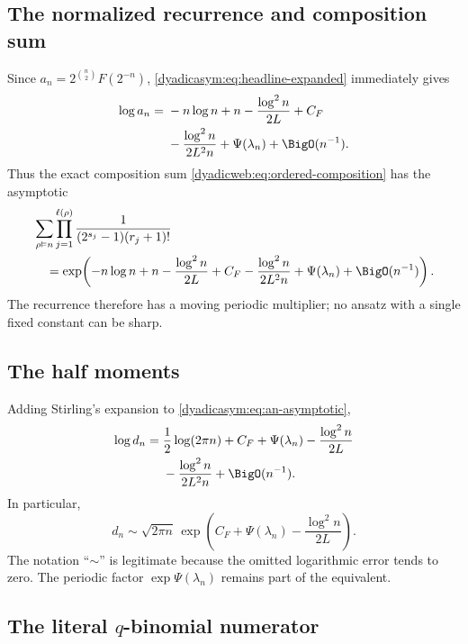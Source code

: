\documentclass[11pt,oneside]{article}
\theoremstyle{definition}
\theoremstyle{remark}
\begin{document}
\subsection{The normalized recurrence and composition sum}

Since $a_n=2^{\binom n2}F(2^{-n})$, \eqref{dyadicasym:eq:headline-expanded} immediately gives
\begin{align}
 \log a_n={}&-n\log n+n-\frac{\log^2n}{2L}+C_F             \notag\\
 &-\frac{\log^2n}{2L^2n}+\Psi(\lambda_n)+\BigO(n^{-1}).   \label{dyadicasym:eq:an-asymptotic}
\end{align}
Thus the exact composition sum \eqref{dyadicweb:eq:ordered-composition} has the asymptotic
\begin{align}
 &\sum_{\rho\vDash n}
 \prod_{j=1}^{\ell(\rho)}
 \frac{1}{(2^{s_j}-1)(r_j+1)!}                             \notag\\
 &\quad=\exp\!\left(
 -n\log n+n-\frac{\log^2n}{2L}+C_F
 -\frac{\log^2n}{2L^2n}+\Psi(\lambda_n)
 +\BigO(n^{-1})\right).                                    \label{dyadicasym:eq:composition-asymptotic}
\end{align}
The recurrence therefore has a moving periodic multiplier; no ansatz with a single fixed
constant can be sharp.

\subsection{The half moments}

Adding Stirling's expansion to \eqref{dyadicasym:eq:an-asymptotic},
\begin{align}
 \log d_n={}&\frac12\log(2\pi n)+C_F+\Psi(\lambda_n)
 -\frac{\log^2n}{2L}                                      \notag\\
 &-\frac{\log^2n}{2L^2n}+\BigO(n^{-1}).                   \label{dyadicasym:eq:dn-asymptotic}
\end{align}
In particular,
\begin{equation}
 d_n\sim\sqrt{2\pi n}\,
 \exp\!\left(C_F+\Psi(\lambda_n)-\frac{\log^2n}{2L}\right).
                                                                    \label{dyadicasym:eq:dn-equivalent}
\end{equation}
The notation ``$\sim$'' is legitimate because the omitted logarithmic error tends to zero.
The periodic factor $\exp\Psi(\lambda_n)$ remains part of the equivalent.

\subsection{The literal \texorpdfstring{$q$}{q}-binomial numerator}
\end{document}
